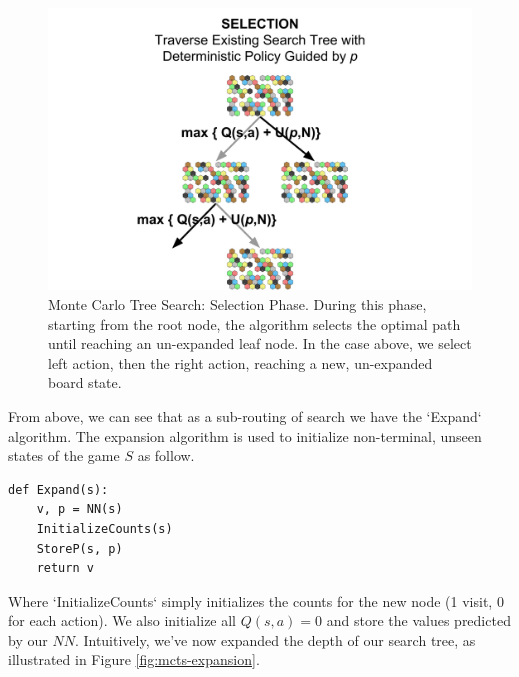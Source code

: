 \documentclass[10pt,twocolumn,letterpaper]{article}
\begin{document}
\begin{figure}
    \centering
    \includegraphics[scale=0.09]{figures/mcts-selection.png}
    \caption{Monte Carlo Tree Search: Selection Phase. During this phase, starting from the root node, the algorithm selects the optimal path until reaching an un-expanded leaf node. In the case above, we select left action, then the right action, reaching a new, un-expanded board state.}
    \label{fig:mcts-selection}
\end{figure}

From above, we can see that as a sub-routing of search we have the `Expand` algorithm. The expansion algorithm is used to initialize non-terminal, unseen states of the game $S$ as follow.

\begin{verbatim}
def Expand(s):
    v, p = NN(s)
    InitializeCounts(s)
    StoreP(s, p)
    return v
\end{verbatim}
Where `InitializeCounts` simply initializes the counts for the new node (1 visit, 0 for each action). We also initialize all $Q(s,a) = 0$ and store the values predicted by our $NN$. Intuitively, we've now expanded the depth of our search tree, as illustrated in Figure \ref{fig:mcts-expansion}.
\end{document}
